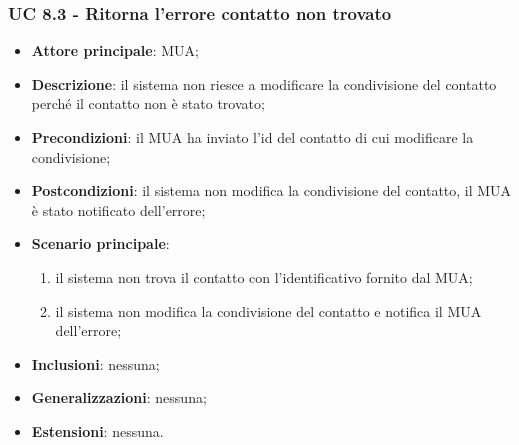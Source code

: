 \subsubsection{UC 8.3 - Ritorna l'errore contatto non trovato} \label{sec:UC8.3}
    \begin{itemize}
        \item \textbf{Attore principale}: MUA;
        \item \textbf{Descrizione}: il sistema non riesce a modificare la condivisione del contatto perché il contatto non è stato trovato;
        \item \textbf{Precondizioni}: il MUA ha inviato l'id del contatto di cui modificare la condivisione;
        \item \textbf{Postcondizioni}: il sistema non modifica la condivisione del contatto, il MUA è stato notificato dell'errore;
        \item \textbf{Scenario principale}:
            \begin{enumerate}
                \item il sistema non trova il contatto con l'identificativo fornito dal MUA;
                \item il sistema non modifica la condivisione del contatto e notifica il MUA dell'errore;
            \end{enumerate}
        \item \textbf{Inclusioni}: nessuna;
        \item \textbf{Generalizzazioni}: nessuna;
        \item \textbf{Estensioni}: nessuna.
    \end{itemize}

